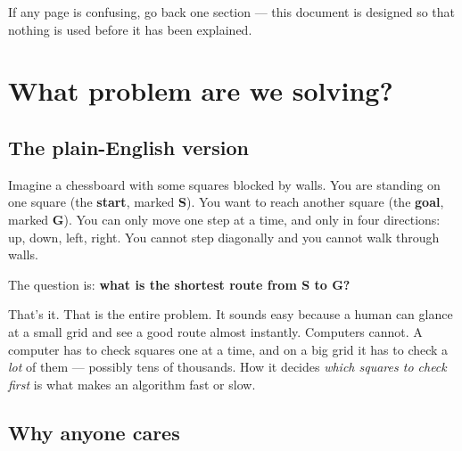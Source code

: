 \documentclass[11pt,a4paper]{article}
\newcommand{\gridbase}[2]{%
  \draw[step=0.6,gray!50,very thin] (0,0) grid (#1*0.6,#2*0.6);
  \draw[black,thick] (0,0) rectangle (#1*0.6,#2*0.6);
}
\newcommand{\fillcell}[3]{%
  \fill[#3] (#1*0.6,#2*0.6) rectangle ({(#1+1)*0.6},{(#2+1)*0.6});
  \draw[gray!50,very thin] (#1*0.6,#2*0.6) rectangle ({(#1+1)*0.6},{(#2+1)*0.6});
}
\newcommand{\celltext}[3]{%
  \node at ({(#1+0.5)*0.6},{(#2+0.5)*0.6}) {\footnotesize #3};
}
\begin{document}
\begin{keybox}
If any page is confusing, go back one section --- this document is designed so that nothing is used before it has been explained.
\end{keybox}

\clearpage

\section{What problem are we solving?}\label{sec:problem}

\subsection{The plain-English version}

Imagine a chessboard with some squares blocked by walls. You are standing on one square (the \textbf{start}, marked \textbf{S}). You want to reach another square (the \textbf{goal}, marked \textbf{G}). You can only move one step at a time, and only in four directions: up, down, left, right. You cannot step diagonally and you cannot walk through walls.

\begin{center}
\end{center}

\noindent The question is: \textbf{what is the shortest route from S to G?}

That's it. That is the entire problem. It sounds easy because a human can glance at a small grid and see a good route almost instantly. Computers cannot. A computer has to check squares one at a time, and on a big grid it has to check a \textit{lot} of them --- possibly tens of thousands. How it decides \textit{which squares to check first} is what makes an algorithm fast or slow.

\subsection{Why anyone cares}
\end{document}
